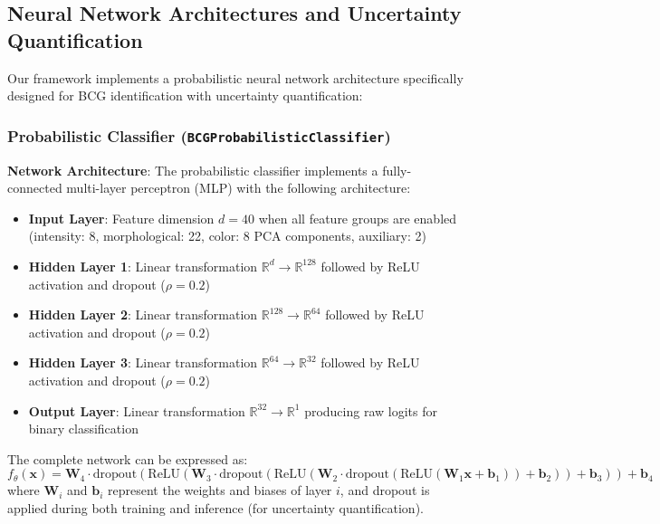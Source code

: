 \documentclass[twocolumn,10pt]{aastex631}
\begin{document}
\subsection{Neural Network Architectures and Uncertainty Quantification}

Our framework implements a probabilistic neural network architecture specifically designed for BCG identification with uncertainty quantification:

\subsubsection{Probabilistic Classifier (\texttt{BCGProbabilisticClassifier})}

\textbf{Network Architecture}: The probabilistic classifier implements a fully-connected multi-layer perceptron (MLP) with the following architecture:

\begin{itemize}
\item \textbf{Input Layer}: Feature dimension $d = 40$ when all feature groups are enabled (intensity: 8, morphological: 22, color: 8 PCA components, auxiliary: 2)
\item \textbf{Hidden Layer 1}: Linear transformation $\mathbb{R}^{d} \rightarrow \mathbb{R}^{128}$ followed by ReLU activation and dropout ($\rho = 0.2$)
\item \textbf{Hidden Layer 2}: Linear transformation $\mathbb{R}^{128} \rightarrow \mathbb{R}^{64}$ followed by ReLU activation and dropout ($\rho = 0.2$)
\item \textbf{Hidden Layer 3}: Linear transformation $\mathbb{R}^{64} \rightarrow \mathbb{R}^{32}$ followed by ReLU activation and dropout ($\rho = 0.2$)
\item \textbf{Output Layer}: Linear transformation $\mathbb{R}^{32} \rightarrow \mathbb{R}^{1}$ producing raw logits for binary classification
\end{itemize}

The complete network can be expressed as:
\begin{equation}
f_{\theta}(\mathbf{x}) = \mathbf{W}_4 \cdot \text{dropout}(\text{ReLU}(\mathbf{W}_3 \cdot \text{dropout}(\text{ReLU}(\mathbf{W}_2 \cdot \text{dropout}(\text{ReLU}(\mathbf{W}_1 \mathbf{x} + \mathbf{b}_1)) + \mathbf{b}_2)) + \mathbf{b}_3)) + \mathbf{b}_4
\end{equation}
where $\mathbf{W}_i$ and $\mathbf{b}_i$ represent the weights and biases of layer $i$, and dropout is applied during both training and inference (for uncertainty quantification).
\end{document}
